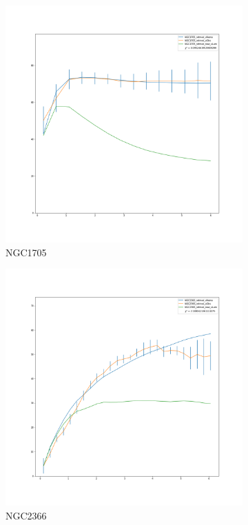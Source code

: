 \documentclass[reprint,%
 amsmath,amssymb,
 aps,
]{revtex4-1}
\begin{document}
\clearpage
  \begin{figure}[h]
\begin{subfigure}{.5\textwidth}
  \centering
  \includegraphics[width=.8\linewidth]{figures/NGC1705_rotmod_XueSofue.png}
  \caption{NGC1705}
  \label{fig:sfig13}
\end{subfigure}
\begin{subfigure}{.5\textwidth}
  \centering
  \includegraphics[width=.8\linewidth]{figures/NGC2366_rotmod_XueSofue.png}
  \caption{NGC2366}
  \label{fig:sfig14}
\end{subfigure}%
\begin{subfigure}{.5\textwidth}

\end{subfigure}
\end{figure}
\end{document}
